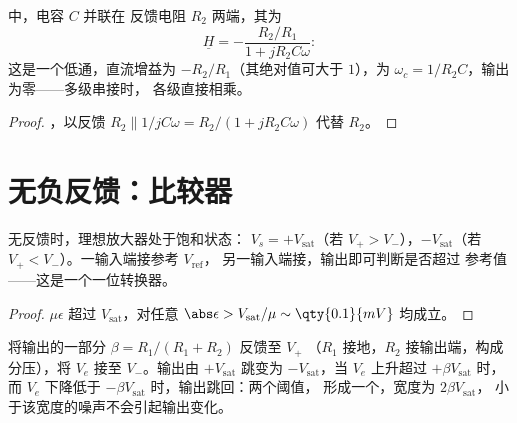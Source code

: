 \begin{proposition}[一阶有源低通滤波器]\label{prop:b1:operational-amplifier:activelp}
中，电容 $C$ 并联在
反馈电阻 $R_2$ 两端，其为
\[
\underline H = -\frac{R_2/R_1}{1 + jR_2C\omega}:
\]
这是一个低通，直流增益为 $-R_2/R_1$（其绝对值可大于 $1$），为 $\omega_c = 1/R_2C$，输出为零——多级串接时，
各级直接相乘。
\end{proposition}

\begin{proof}
，以反馈 $R_2 \parallel 1/jC\omega
= R_2/(1 + jR_2C\omega)$ 代替 $R_2$。
\end{proof}

\section{无负反馈：比较器}

\begin{proposition}[比较器]\label{prop:b1:operational-amplifier:comparator}
无反馈时，理想放大器处于饱和状态：
$V_s = +V_{\mathrm{sat}}$（若 $V_+ > V_-$），$-V_{\mathrm{sat}}$（若
$V_+ < V_-$）。一输入端接参考 $V_{\mathrm{ref}}$，
另一输入端接，输出即可判断是否超过
参考值——这是一个一位转换器。
\end{proposition}

\begin{proof}
$\mu\epsilon$ 超过 $V_{\mathrm{sat}}$，对任意 $\abs\epsilon >
V_{\mathrm{sat}}/\mu \sim \qty{0.1}{mV}$ 均成立。
\end{proof}

\begin{proposition}[施密特触发器]\label{prop:b1:operational-amplifier:schmitt}
将输出的一部分 $\beta = R_1/(R_1 + R_2)$ 反馈至 $V_+$
（$R_1$ 接地，$R_2$ 接输出端，构成分压），将
$V_e$ 接至 $V_-$。输出由 $+V_{\mathrm{sat}}$ 跳变为
$-V_{\mathrm{sat}}$，当 $V_e$ 上升超过 $+\beta V_{\mathrm{sat}}$ 时，
而 $V_e$ 下降低于 $-\beta V_{\mathrm{sat}}$ 时，输出跳回：两个阈值，
形成一个\emph{}，宽度为 $2\beta V_{\mathrm{sat}}$，
小于该宽度的噪声不会引起输出变化。
\end{proposition}

